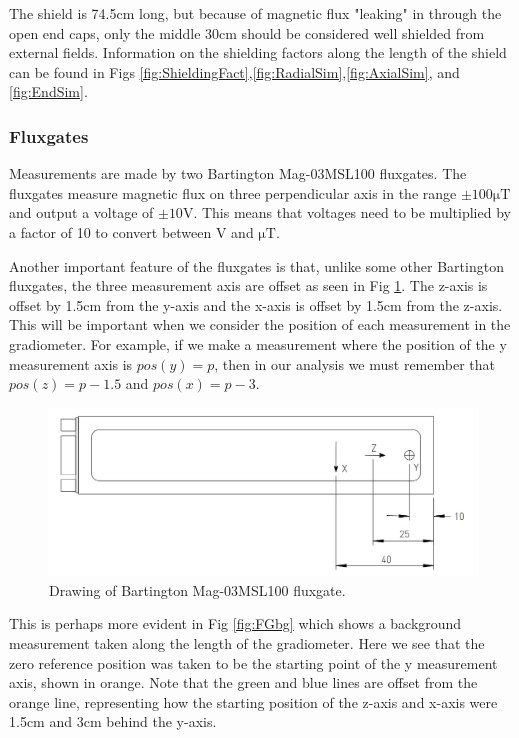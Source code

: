 \documentclass{TheMartianReport}
\begin{document}
The shield is 74.5cm long, but because of magnetic flux "leaking" in through the open end caps, only the middle 30cm should be considered well shielded from external fields. Information on the shielding factors along the length of the shield can be found in Figs \ref{fig:ShieldingFact},\ref{fig:RadialSim},\ref{fig:AxialSim}, and \ref{fig:EndSim}.

\subsubsection{Fluxgates}
Measurements are made by two Bartington Mag-03MSL100 fluxgates. The fluxgates measure magnetic flux on three perpendicular axis in the range $\pm 100 \mathrm{\mu T}$ and output a voltage of $\pm 10 \mathrm{V}$. This means that voltages need to be multiplied by a factor of 10 to convert between $\mathrm{V}$ and $\mathrm{\mu T}$. 

Another important feature of the fluxgates is that, unlike some other Bartington fluxgates, the three measurement axis are offset as seen in Fig \ref{fig:FGsmall}. The z-axis is offset by 1.5cm from the y-axis and the x-axis is offset by 1.5cm from the z-axis. This will be important when we consider the position of each measurement in the gradiometer. For example, if we make a measurement where the position of the y measurement axis is $pos(y)=p$, then in our analysis we must remember that $pos(z)=p-1.5$ and $pos(x)=p-3$.

\begin{figure}[h]
	\centering
	\includegraphics[scale=0.4]{FG_drawing_small}
	\caption{Drawing of Bartington Mag-03MSL100 fluxgate.}
	\label{fig:FGsmall}
\end{figure}

This is perhaps more evident in Fig \ref{fig:FGbg} which shows a background measurement taken along the length of the gradiometer. Here we see that the zero reference position was taken to be the starting point of the y measurement axis, shown in orange. Note that the green and blue lines are offset from the orange line, representing how the starting position of the z-axis and x-axis were 1.5cm and 3cm behind the y-axis. %
\end{document}
